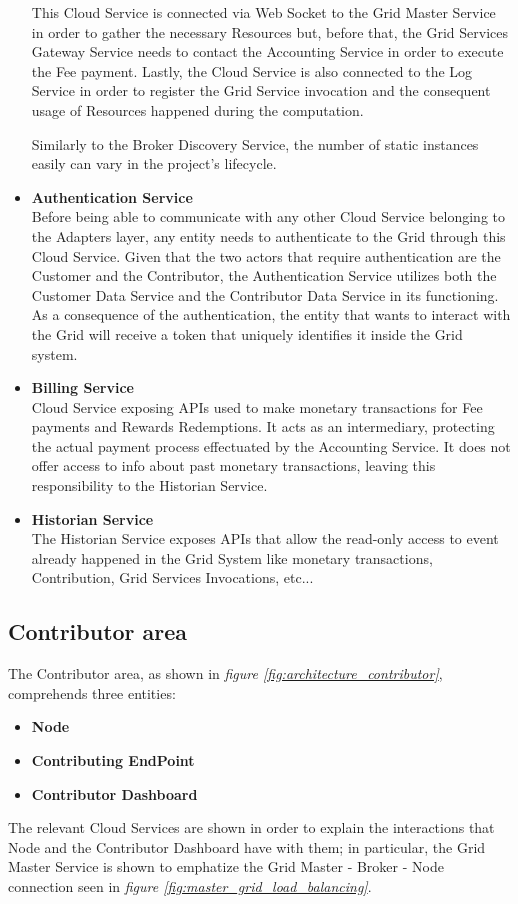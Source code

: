 \begin{itemize}
    This Cloud Service is connected via Web Socket to the Grid Master Service in order to gather the necessary Resources but, before that, the Grid Services Gateway Service needs to contact the Accounting Service in order to execute the Fee payment. Lastly, the Cloud Service is also connected to the Log Service in order to register the Grid Service invocation and the consequent usage of Resources happened during the computation.

    Similarly to the Broker Discovery Service, the number of static instances easily can vary in the project's lifecycle. 

    \item \textbf{Authentication Service}\\
    Before being able to communicate with any other Cloud Service belonging to the Adapters layer, any entity needs to authenticate to the Grid through this Cloud Service. Given that the two actors that require authentication are the Customer and the Contributor, the Authentication Service utilizes both the Customer Data Service and the Contributor Data Service in its functioning. As a consequence of the authentication, the entity that wants to interact with the Grid will receive a token that uniquely identifies it inside the Grid system.

    \item \textbf{Billing Service}\\
    Cloud Service exposing APIs used to make monetary transactions for Fee payments and Rewards Redemptions. It acts as an intermediary, protecting the actual payment process effectuated by the Accounting Service.
    It does not offer access to info about past monetary transactions, leaving this responsibility to the Historian Service.

    \item \textbf{Historian Service}\\
    The Historian Service exposes APIs that allow the read-only access to event already happened in the Grid System like monetary transactions, Contribution, Grid Services Invocations, etc...

\end{itemize}
\vspace{20mm}

\subsection{Contributor area}\label{contributor_area}
The Contributor area, as shown in \textit{figure \ref{fig:architecture_contributor}}, comprehends three entities:
\begin{itemize}
    \item \textbf{Node}
    \item \textbf{Contributing EndPoint}
    \item \textbf{Contributor Dashboard}
\end{itemize}
The relevant Cloud Services are shown in order to explain the interactions that Node and the Contributor Dashboard have with them; in particular, the Grid Master Service is shown to emphatize the Grid Master - Broker - Node connection seen in \textit{figure \ref{fig:master_grid_load_balancing}}.

